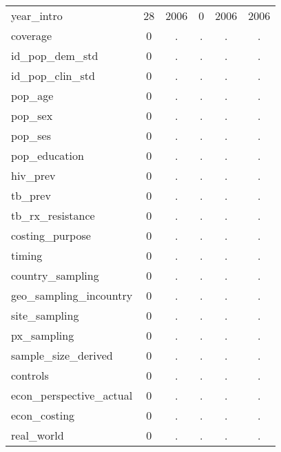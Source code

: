\begin{table}[htbp]
\begin{tabular}{l*{1}{ccccc}}
year\_intro  &          28&        2006&           0&        2006&        2006\\
coverage    &           0&           .&           .&           .&           .\\
id\_pop\_dem\_std&           0&           .&           .&           .&           .\\
id\_pop\_clin\_std&           0&           .&           .&           .&           .\\
pop\_age     &           0&           .&           .&           .&           .\\
pop\_sex     &           0&           .&           .&           .&           .\\
pop\_ses     &           0&           .&           .&           .&           .\\
pop\_education&           0&           .&           .&           .&           .\\
hiv\_prev    &           0&           .&           .&           .&           .\\
tb\_prev     &           0&           .&           .&           .&           .\\
tb\_rx\_resistance&           0&           .&           .&           .&           .\\
costing\_purpose&           0&           .&           .&           .&           .\\
timing      &           0&           .&           .&           .&           .\\
country\_sampling&           0&           .&           .&           .&           .\\
geo\_sampling\_incountry&           0&           .&           .&           .&           .\\
site\_sampling&           0&           .&           .&           .&           .\\
px\_sampling &           0&           .&           .&           .&           .\\
sample\_size\_derived&           0&           .&           .&           .&           .\\
controls    &           0&           .&           .&           .&           .\\
econ\_perspective\_actual&           0&           .&           .&           .&           .\\
econ\_costing&           0&           .&           .&           .&           .\\
real\_world  &           0&           .&           .&           .&           .\\

\end{tabular}
\end{table}
